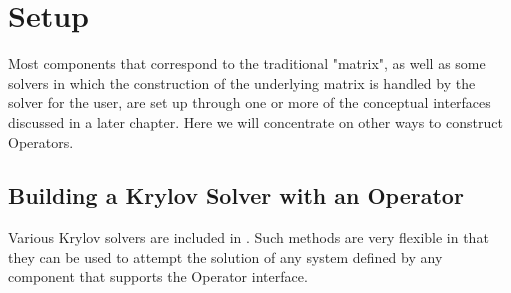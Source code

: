 \section{Setup}

Most components that correspond to the traditional "matrix", as well as
some solvers in which the 
construction of the underlying matrix is handled by the solver for the user,
are set up through one or more 
of the conceptual interfaces discussed in a later chapter. Here we will
concentrate on other ways to 
construct Operators.

\subsection{Building a Krylov Solver with an Operator}

Various Krylov solvers are included in \hypre{}.
Such methods are very flexible in that they can be used to attempt
the solution of any system defined by any component that supports the
Operator interface.
